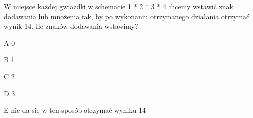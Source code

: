 \begin{tresc}
W miejsce każdej gwiazdki w schemacie 1 * 2 * 3 * 4 chcemy wstawić znak dodawania lub mnożenia tak, by po wykonaniu otrzymanego działania otrzymać wynik 14. Ile znaków dodawania wstawimy?
\end{tresc}
\begin{wariant}{A} 0 \end{wariant}
\begin{wariant}{B} 1 \end{wariant}
\begin{wariant}{C} 2 \end{wariant}
\begin{wariant}{D} 3 \end{wariant}
\begin{wariant}{E} nie da się w ten sposób otrzymać wyniku 14 \end{wariant}
